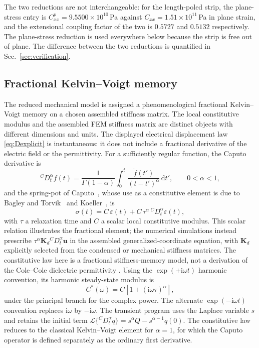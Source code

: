 The two reductions are not interchangeable: for the length-poled strip, the plane-stress entry is
$C^{p}_{xx}=9.5500\times10^{10}$\,Pa against $C_{xx}=1.51\times10^{11}$\,Pa in
plane strain, and the extensional coupling factor of the two is $0.5727$ and
$0.5132$ respectively. The plane-stress reduction is used everywhere below
because the strip is free out of plane. The difference between the two
reductions is quantified in Sec.~\ref{sec:verification}.

\FloatBarrier
\subsection{Fractional Kelvin--Voigt memory}
\label{sec:fracmem}

The reduced mechanical model is assigned a phenomenological fractional
Kelvin--Voigt memory on a chosen assembled stiffness matrix. The local
constitutive modulus and the assembled FEM stiffness matrix are distinct
objects with different dimensions and units. The displayed electrical
displacement law \eqref{eq:Dexplicit} is instantaneous: it does not include
a fractional derivative of the electric field or the permittivity. For a
sufficiently regular function, the Caputo derivative is
\begin{equation}
  {}^{C}\!D_t^{\alpha}f(t) = \frac{1}{\Gamma(1-\alpha)}
     \int_{0}^{t}\frac{\dot f(t')}{(t-t')^{\alpha}}\,\mathrm{d}t',
  \qquad 0<\alpha<1,
  \label{eq:caputo}
\end{equation}
and the spring-pot of Caputo~\cite{Caputo1967}, whose use as a constitutive
element is due to Bagley and Torvik~\cite{BagleyTorvik1983} and
Koeller~\cite{Koeller1984}, is
\begin{equation}
  \sigma(t) = C\,\varepsilon(t) + C\,\tau^{\alpha}\,
              {}^{C}\!D_t^{\alpha}\varepsilon(t),
  \label{eq:kv}
\end{equation}
with $\tau$ a relaxation time and $C$ a scalar local constitutive
modulus. This scalar relation illustrates the fractional element; the
numerical simulations instead prescribe $\tau^\alpha\mathbf K_d
{}^{C}\!D_t^{\alpha}\mathbf u$ in the assembled generalized-coordinate
equation, with $\mathbf K_d$ explicitly selected from the
condensed or mechanical stiffness matrices. The constitutive law here is a fractional stiffness-memory model, not
a derivation of the Cole--Cole dielectric permittivity
\cite{ColeCole1941,HavriliakNegami1967}. Using the $\exp(+\mathrm{i}\omega t)$ harmonic convention, its
harmonic steady-state modulus is
\begin{equation}
  C^{*}(\omega) = C\left[1+(\mathrm{i}\omega\tau)^{\alpha}\right],
  \label{eq:kvfreq}
\end{equation}
under the principal branch for the complex power. The alternate
$\exp(-\mathrm{i}\omega t)$ convention replaces $\mathrm{i}\omega$
by $-\mathrm{i}\omega$. The transient program uses the Laplace variable
$s$ and retains the initial term
$\mathcal L\{{}^{C}D_t^\alpha q\}=s^\alpha Q-s^{\alpha-1}q(0)$.
The constitutive law reduces to the classical Kelvin--Voigt element for $\alpha=1$,
for which the Caputo operator is defined separately as the ordinary
first derivative.

